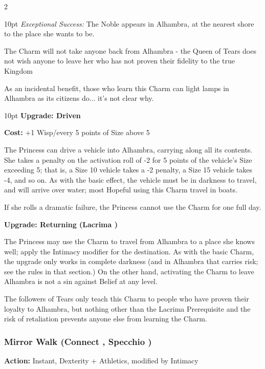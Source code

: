 \begin{multicols}{2}
\begin{myindentpar}{10pt}
	\emph{Exceptional Success:} The Noble appears in Alhambra, at the nearest shore to the place she wants to be.\end{myindentpar}
	
\noindent The Charm will not take anyone back from Alhambra - the Queen of Tears does not wish anyone to leave her who has not proven their fidelity to the true Kingdom

As an incidental benefit, those who learn this Charm can light lamps in Alhambra as its citizens do... it's not clear why. 

\begin{myindentpar}{10pt} \textbf{Upgrade: Driven}

\noindent \textbf{Cost:} +1 Wisp/every 5 points of Size above 5

The Princess can drive a vehicle into Alhambra, carrying along all its contents. She takes a penalty on the activation roll of -2 for 5 points of the vehicle's Size exceeding 5; that is, a Size 10 vehicle takes a -2 penalty, a Size 15 vehicle takes -4, and so on. As with the basic effect, the vehicle must be in darkness to travel, and will arrive over water; most Hopeful using this Charm travel in boats.

If she rolls a dramatic failure, the Princess cannot use the Charm for one full day.

\textbf{Upgrade: Returning (Lacrima \textbullet\textbullet\textbullet)}

The Princess may use the Charm to travel from Alhambra to a place she knows well; apply the Intimacy modifier for the destination. As with the basic Charm, the upgrade only works in complete darkness (and in Alhambra that carries risk; see the rules in that section.) On the other hand, activating the Charm to leave Alhambra is not a sin against Belief at any level.

The followers of Tears only teach this Charm to people who have proven their loyalty to Alhambra, but nothing other than the Lacrima Prerequisite and the risk of retaliation prevents anyone else from learning the Charm.\end{myindentpar}

\subsubsection*{Mirror Walk (Connect \textbullet\textbullet\textbullet\textbullet, Specchio \textbullet\textbullet)}

\noindent \textbf{Action:} Instant, Dexterity + Athletics, modified by Intimacy


\end{multicols}

